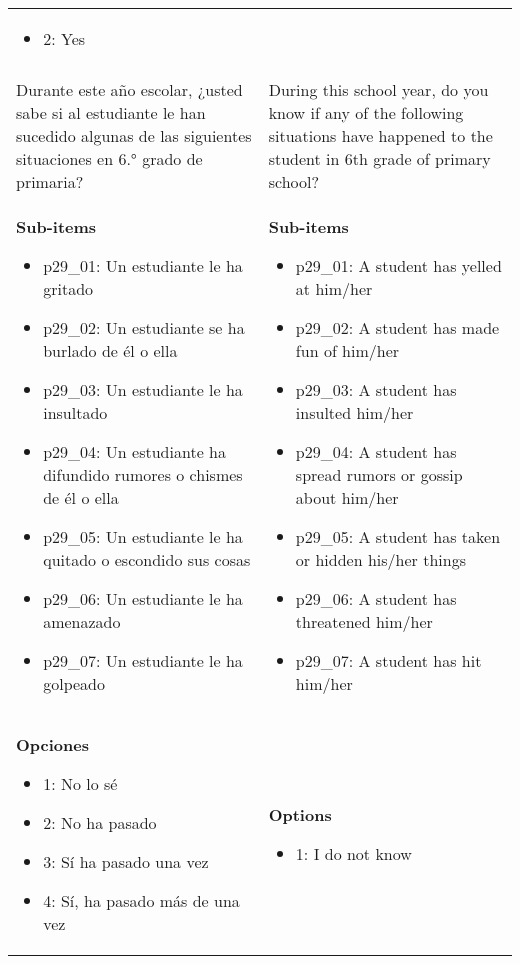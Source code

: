 \documentclass[11pt]{article}
\begin{document}
\begin{longtable}{@{}LL@{}}
\begin{itemize}[leftmargin=*]
\item 2: Yes\end{itemize} \\
\addlinespace[4pt]
 \\ 
Durante este año escolar, ¿usted sabe si al estudiante le han sucedido algunas de las siguientes situaciones en 6.° grado de primaria? & During this school year, do you know if any of the following situations have happened to the student in 6th grade of primary school? \\
\textbf{Sub-items}\par\begin{itemize}[leftmargin=*]\item p29\_01: Un estudiante le ha gritado
\item p29\_02: Un estudiante se ha burlado de él o ella
\item p29\_03: Un estudiante le ha insultado
\item p29\_04: Un estudiante ha difundido rumores o chismes de él o ella
\item p29\_05: Un estudiante le ha quitado o escondido sus cosas
\item p29\_06: Un estudiante le ha amenazado
\item p29\_07: Un estudiante le ha golpeado\end{itemize} & \textbf{Sub-items}\par\begin{itemize}[leftmargin=*]\item p29\_01: A student has yelled at him/her
\item p29\_02: A student has made fun of him/her
\item p29\_03: A student has insulted him/her
\item p29\_04: A student has spread rumors or gossip about him/her
\item p29\_05: A student has taken or hidden his/her things
\item p29\_06: A student has threatened him/her
\item p29\_07: A student has hit him/her\end{itemize} \\
\textbf{Opciones}\par\begin{itemize}[leftmargin=*]\item 1: No lo sé
\item 2: No ha pasado
\item 3: Sí ha pasado una vez
\item 4: Sí, ha pasado más de una vez\end{itemize} & \textbf{Options}\par\begin{itemize}[leftmargin=*]\item 1: I do not know

\end{itemize}
\end{longtable}
\end{document}
